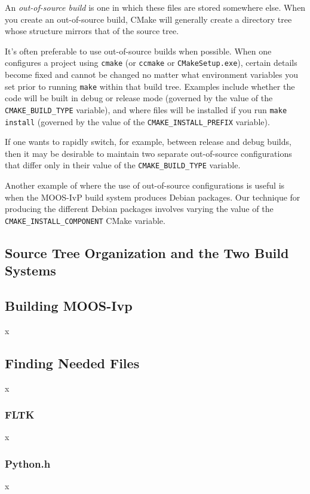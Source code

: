 \documentclass[letterpaper,10pt]{article}
\begin{document}
An \textit{out-of-source build} is one in which these files are stored somewhere
else.  When you create an out-of-source build, CMake will generally create a
directory tree whose structure mirrors that of the source tree.

It's often preferable to use out-of-source builds when possible.  When one
configures a project using \verb|cmake| (or \verb|ccmake| or 
\verb|CMakeSetup.exe|), certain details become fixed and cannot be changed
no matter what environment variables you set prior to running \verb|make|
within that build tree.  Examples include whether the code will be built
in debug or release mode (governed by the value of the \verb|CMAKE_BUILD_TYPE|
variable), and where files will be installed if you run \verb|make install|
(governed by the value of the \verb|CMAKE_INSTALL_PREFIX| variable).  

If one wants to rapidly switch, for example, between release and debug builds,
then it may be desirable to maintain two separate out-of-source configurations
that differ only in their value of the \verb|CMAKE_BUILD_TYPE| variable.

Another example of where the use of out-of-source configurations is useful 
is when the MOOS-IvP build system produces Debian packages.  Our technique
for producing the different Debian packages involves varying the value of
the \verb|CMAKE_INSTALL_COMPONENT| CMake variable.   

\subsection{Source Tree Organization and the Two Build Systems}

\subsection{Building MOOS-Ivp}
x

\subsection{Finding Needed Files}
x

\subsubsection{FLTK}
x

\subsubsection{Python.h}
x
\end{document}
